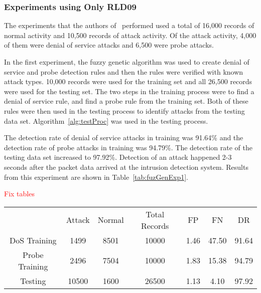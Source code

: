 \documentclass{sig-alternate}
\newcommand{\mycomment}[1]{\textcolor{red}{#1}}
\begin{document}
\subsubsection{Experiments using Only RLD09}
The experiments that the authors of~\cite{6496342, 6559603} performed used a total of 16,000 records of normal activity and 10,500 records of attack activity. Of the attack activity, 4,000 of them were denial of service attacks and 6,500 were probe attacks.

In the first experiment, the fuzzy genetic algorithm was used to create denial of service and probe detection rules and then the rules were verified with known attack types. 10,000 records were used for the training set and all 26,500 records were used for the testing set. The two steps in the training process were to find a denial of service rule, and find a probe rule from the training set. Both of these rules were then used in the testing process to identify attacks from the testing data set. Algorithm~\ref{alg:testProc} was used in the testing process.

\begin{algorithm}
\caption{}
\label{alg:testProc}
\begin{algorithmic}
\ELSE {}
\ENDIF
\end{algorithmic}
\end{algorithm}

The detection rate of denial of service attacks in training was 91.64\% and the detection rate of probe attacks in training was 94.79\%. The detection rate of the testing data set increased to 97.92\%. Detection of an attack happened 2-3 seconds after the packet data arrived at the intrusion detection system. Results from this experiment are shown in Table~\ref{tab:fuzGenExp1}.

\mycomment{Fix tables}

\begin{table*}
\caption{Results from Experiment 1}
\begin{tabular}{|ccccccc|} \hline
 & Attack & Normal & Total Records & FP & FN & DR\\
DoS Training & 1499 & 8501 & 10000 & 1.46 & 47.50 & 91.64\\
Probe Training & 2496 & 7504 & 10000 & 1.83 & 15.38 & 94.79\\
Testing & 10500 & 1600 & 26500 & 1.13 & 4.10 & 97.92\\
\hline\end{tabular}
\label{tab:fuzGenExp1}
\end{table*}
\end{document}
